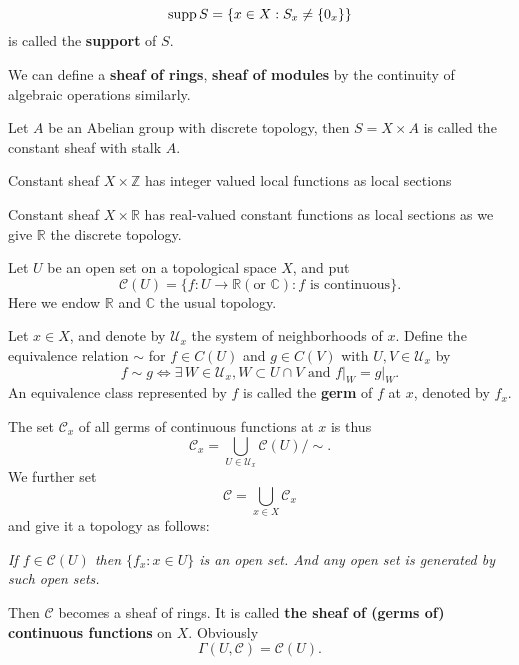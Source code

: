 \documentclass[12pt]{article}
\begin{document}
\begin{definition}
  \[
    \operatorname{supp}S=\{x\in X:S_x\neq \{0_x\}\}
  \] is called the \textbf{support} of \(S\).
\end{definition}

We can define a \textbf{sheaf of rings}, \textbf{sheaf of modules} by the continuity
of algebraic operations similarly.

\begin{example}
  Let \(A\) be an Abelian group with discrete topology, then \(S=X\times A\) is
  called the constant sheaf with stalk \(A\).
\end{example}

\begin{example}
  Constant sheaf \(X\times \mathbb{Z}\) has integer valued local functions as local
  sections
\end{example}

\begin{example}
  Constant sheaf \(X\times \mathbb{R}\) has real-valued constant functions as local
  sections as we give \(\mathbb{R}\) the discrete topology.
\end{example}

\begin{example}
  Let \(U\) be an open set on a topological space \(X\), and put \[
    \mathcal{C}(U)=\{f\colon U\to \mathbb{R}(\text{or }\mathbb{C}):
    f\text{ is continuous}\}
  .\] Here we endow \(\mathbb{R}\) and \(\mathbb{C}\) the usual topology.

  Let \(x\in X\), and denote by \(\mathcal{U}_x\) the system of neighborhoods of \(x\).
  Define the equivalence relation \(\sim\) for \(f\in C(U)\) and \(g\in C(V)\) with
  \(U,V\in \mathcal{U}_x\) by \[
    f\sim g \iff \exists\,W\in \mathcal{U}_x, W\subset U\cap V\text{ and }
    f\big|_W=g\big|_W
  .\] An equivalence class represented by \(f\) is called the \textbf{germ} of \(f\)
  at \(x\), denoted by \(f_x\).

  The set \(\mathcal{C}_x\) of all germs of continuous functions at \(x\) is thus \[
    \mathcal{C}_x=\bigcup_{U\in \mathcal{U}_x}\mathcal{C}(U)/\sim
  .\] We further set \[
    \mathcal{C}=\bigcup_{x\in X}\mathcal{C}_x
  \] and give it a topology as follows:

  \emph{
  If \(f \in \mathcal{C}(U)\) then \(\{f_x:x\in U\}\) is an open set. And any open set
  is generated by such open sets.}

  Then \(\mathcal{C}\) becomes a sheaf of rings. It is called \textbf{the sheaf of
  (germs of) continuous functions} on \(X\). Obviously \[
    \Gamma(U,\mathcal{C})=\mathcal{C}(U)
  .\] 
\end{example}
\end{document}
